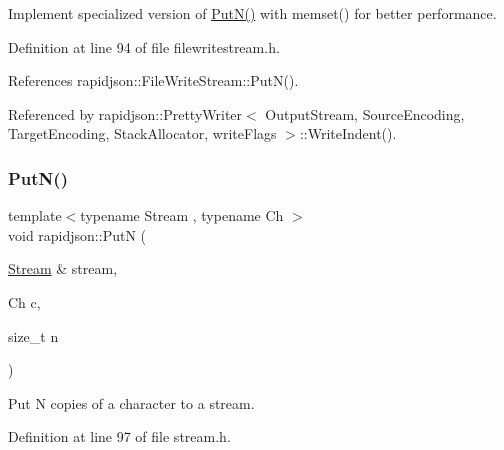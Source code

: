 Implement specialized version of \mbox{\hyperlink{namespacerapidjson_a1ac13bac5976fc06587e00fc0bcfb32a}{Put\+N()}} with memset() for better performance. 



Definition at line 94 of file filewritestream.\+h.


\begin{DoxyCode}{0}

\end{DoxyCode}


References rapidjson\+::\+File\+Write\+Stream\+::\+Put\+N().



Referenced by rapidjson\+::\+Pretty\+Writer$<$ Output\+Stream, Source\+Encoding, Target\+Encoding, Stack\+Allocator, write\+Flags $>$\+::\+Write\+Indent().

\mbox{\label{namespacerapidjson_a1d49d2cab617858b53a1db23b1759f43}} 
\subsubsection{\texorpdfstring{PutN()}{PutN()}\hspace{0.1cm}{\footnotesize\ttfamily [3/4]}}
{\footnotesize\ttfamily template$<$typename Stream , typename Ch $>$ \\
void rapidjson\+::\+PutN (\begin{DoxyParamCaption}\item[{\mbox{\hyperlink{classrapidjson_1_1_stream}{Stream}} \&}]{stream,  }\item[{Ch}]{c,  }\item[{size\+\_\+t}]{n }\end{DoxyParamCaption})}



Put N copies of a character to a stream. 



Definition at line 97 of file stream.\+h.


\begin{DoxyCode}{0}

\end{DoxyCode}


